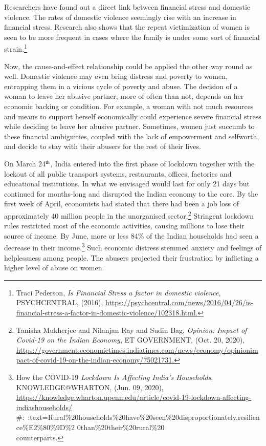 \begin{multicols}{2}

\noi
Researchers have found out a direct link between financial stress and domestic violence. The
rates of domestic violence seemingly rise with an increase in financial stress. Research also
shows that the repeat victimization of women is seen to be more frequent in cases where the
family is under some sort of financial strain.\footnote{Traci Pederson, \textit{Is Financial Stress a factor in domestic violence}, PSYCHCENTRAL, (2016),
\url{https://psychcentral.com/news/2016/04/26/is-financial-stress-a-factor-in-domestic-violence/102318.html.}}

\noi
Now, the cause-and-effect relationship could be applied the other way round as well.
Domestic violence may even bring distress and poverty to women, entrapping them in a
vicious cycle of poverty and abuse. The decision of a woman to leave her abusive partner,
more of often than not, depends on her economic backing or condition. For example, a
woman with not much resources and means to support herself economically could experience
severe financial stress while deciding to leave her abusive partner. Sometimes, women just
succumb to these financial ambiguities, coupled with the lack of empowerment and selfworth, and decide to stay with their abusers for the rest of their lives.

\noi
On March 24$^{\rm th}$, India entered into the first phase of lockdown together with the lockout of all
public transport systems, restaurants, offices, factories and educational institutions. In what
we envisaged would last for only 21 days but continued for months-long and disrupted the
Indian economy to the core. By the first week of April, economists had stated that there had
been a job loss of approximately 40 million people in the unorganised sector.\footnote{Tanisha Mukherjee and Nilanjan Ray and Sudin Bag, \textit{Opinion: Impact of Covid-19 on the Indian Economy},
ET GOVERNMENT, (Oct. 20, 2020), \url{https://government.economictimes.indiatimes.com/news/economy/opinionimpact-of-covid-19-on-the-indian-economy/75021731.}}
 Stringent
lockdown rules restricted most of the economic activities, causing millions to lose their
source of income. By June, more or less 84\% of the Indian households had seen a decrease in their income.\footnote{How the COVID-19 \textit{Lockdown Is Affecting India’s Households}, KNOWLEDGE@WHARTON, (Jun. 09, 2020),\\
\url{https://knowledge.wharton.upenn.edu/article/covid-19-lockdown-affecting-indiashouseholds/}\\\#:~:text=Rural\%20households\%20have\%20seen\%20disproportionately,resilience\%E2\%80\%9D\%2
0than\%20their\%20rural\%20\\ counterparts.} Such economic distress stemmed anxiety and feelings of helplessness among
people. The abusers projected their frustration by inflicting a higher level of abuse on women. 
 

\end{multicols}
